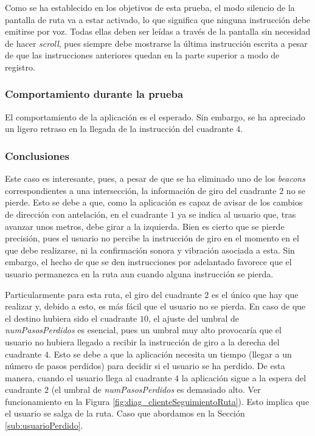 Como se ha establecido en los objetivos de esta prueba, el modo silencio de la pantalla de ruta va a estar activado, lo que significa que ninguna instrucción debe emitirse por voz. Todas ellas deben ser leídas a través de la pantalla sin necesidad de hacer \textit{scroll}, pues siempre debe mostrarse la última instrucción escrita a pesar de que las instrucciones anteriores quedan en la parte superior a modo de registro. 


\subsubsection*{Comportamiento durante la prueba}

El comportamiento de la aplicación es el esperado. Sin embargo, se ha apreciado un ligero retraso en la llegada de la instrucción del cuadrante $4$. 

 
\subsubsection*{Conclusiones}

Este caso es interesante, pues, a pesar de que se ha eliminado uno de los \textit{beacons} correspondientes a una intersección, la información de giro del cuadrante $2$ no se pierde. Esto se debe a que, como la aplicación es capaz de avisar de los cambios de dirección con antelación, en el cuadrante $1$ ya se indica al usuario que, tras avanzar unos metros, debe girar a la izquierda. Bien es cierto que se pierde precisión, pues el usuario no percibe la instrucción de giro en el momento en el que debe realizarse, ni la confirmación sonora y vibración asociada a esta. Sin embargo, el hecho de que se den instrucciones por adelantado favorece que el usuario permanezca en la ruta aun cuando alguna instrucción se pierda. 

Particularmente para esta ruta, el giro del cuadrante $2$ es el único que hay que realizar y, debido a esto, es más fácil que el usuario no se pierda. En caso de que el destino hubiera sido el cuadrante $10$, el ajuste del umbral de \textit{numPasosPerdidos} es esencial, pues un umbral muy alto provocaría que el usuario no hubiera llegado a recibir la instrucción de giro a la derecha del cuadrante $4$. Esto se debe a que la aplicación necesita un tiempo (llegar a un número de pasos perdidos) para decidir si el usuario se ha perdido. De esta manera, cuando el usuario llega al cuadrante $4$ la aplicación sigue a la espera del cuadrante $2$ (el umbral de \textit{numPasosPerdidos} es demasiado alto. Ver funcionamiento en la Figura \ref{fig:diag_clienteSeguimientoRuta}). Esto implica que el usuario se salga de la ruta. Caso que abordamos en la Sección \ref{sub:usuarioPerdido}.



